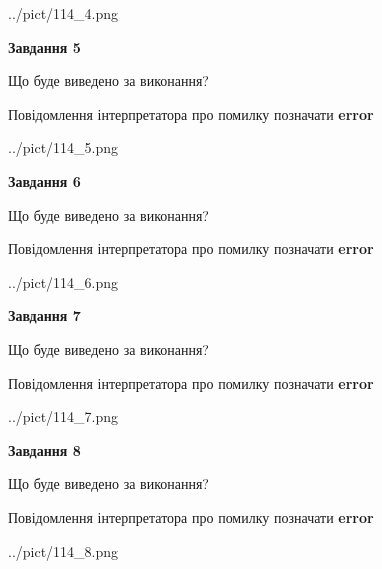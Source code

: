 \documentclass[12pt, ukrainian]{article}
\begin{document}
{\begin{center}
	{../pict/114_4.png}
\end{center}
\newpage

{\begin {center}\textbf{Завдання 5}\end {center}}\par
Що буде виведено за виконання? \par
Повідомлення інтерпретатора про помилку позначати \textbf{error}

\begin{center}
	{../pict/114_5.png}
\end{center}
\newpage

{\begin {center}\textbf{Завдання 6}\end {center}}\par
Що буде виведено за виконання? \par
Повідомлення інтерпретатора про помилку позначати \textbf{error}

\begin{center}
	{../pict/114_6.png}
\end{center}
\newpage

{\begin {center}\textbf{Завдання 7}\end {center}}\par
Що буде виведено за виконання? \par
Повідомлення інтерпретатора про помилку позначати \textbf{error}

\begin{center}
	{../pict/114_7.png}
\end{center}
\newpage

{\begin {center}\textbf{Завдання 8}\end {center}}\par
Що буде виведено за виконання? \par
Повідомлення інтерпретатора про помилку позначати \textbf{error}

\begin{center}
	{../pict/114_8.png}
\end{center}
\newpage

}
\end{document}
